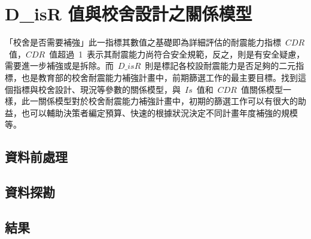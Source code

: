 



\section{D\_isR 值與校舍設計之關係模型}

「校舍是否需要補強」此一指標其數值之基礎即為詳細評估的耐震能力指標~$CDR$~值，$CDR$~值超過~1~表示其耐震能力尚符合安全規範，反之，則是有安全疑慮，需要進一步補強或是拆除。而~$D\_isR$~則是標記各校設耐震能力是否足夠的二元指標，也是教育部的校舍耐震能力補強計畫中，前期篩選工作的最主要目標。找到這個指標與校舍設計、現況等參數的關係模型，與~$Is$~值和~$CDR$~值關係模型一樣，此一關係模型對於校舍耐震能力補強計畫中，初期的篩選工作可以有很大的助益，也可以輔助決策者編定預算、快速的根據狀況決定不同計畫年度補強的規模等。

\subsection{資料前處理}
\subsection{資料探勘}
\subsection{結果}

